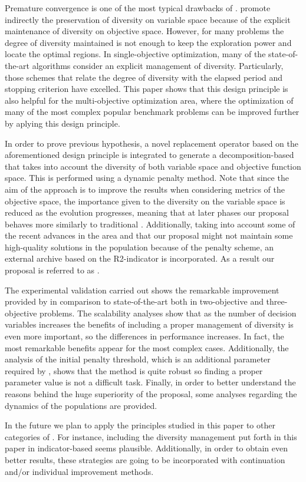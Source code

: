 Premature convergence is one of the most typical drawbacks of \EAS{}.
%
\MOEAS{} promote indirectly the preservation of diversity on variable space
because of the explicit maintenance of diversity on objective space.
%
However, for many problems the degree of diversity maintained is not enough to keep the exploration
power and locate the optimal regions.
%
In single-objective optimization, many of the state-of-the-art algorithms consider an explicit management of
diversity.
%
Particularly, those schemes that relate the degree of diversity with the elapsed period and stopping criterion
have excelled.
%
This paper shows that this design principle is also helpful for the multi-objective optimization area,
where the optimization of many of the most complex popular benchmark problems can be improved further
by aplying this design principle.

In order to prove previous hypothesis, a novel replacement operator based on the aforementioned design principle
is integrated to generate a decomposition-based \MOEA{} that takes into account the diversity of both variable 
space and objective function space.
%
This is performed using a dynamic penalty method. 
%
Note that since the aim of the approach is to improve the results when considering metrics of the objective space,
the importance given to the diversity on the variable space is reduced as the evolution progresses, meaning that
at later phases our proposal behaves more similarly to traditional \MOEAS{}.
%
Additionally, taking into account some of the recent advances in the area and that our proposal might not maintain
some high-quality solutions in the population because of the penalty scheme, an external archive based on the
R2-indicator is incorporated.
%
As a result our proposal is referred to as \AVSDMOEAD{}.
%

The experimental validation carried out shows the remarkable improvement provided by \AVSDMOEAD{} in comparison to
state-of-the-art \MOEAS{} both in two-objective and three-objective problems.
%
The scalability analyses show that as the number of decision variables increases the benefits of including
a proper management of diversity is even more important, so the differences in performance increases.
%
In fact, the most remarkable benefits appear for the most complex cases.
%
Additionally, the analysis of the initial penalty threshold, which is an additional parameter required by \AVSDMOEAD{}, 
shows that the method is quite robust so finding a proper parameter value is not a difficult task.
%
Finally, in order to better understand the reasons behind the huge superiority of the proposal, some analyses regarding
the dynamics of the populations are provided.

In the future we plan to apply the principles studied in this paper to other categories of \MOEAS{}.
%
For instance, including the diversity management put forth in this paper in indicator-based \MOEAS{} seems plausible.
%
Additionally, in order to obtain even better results, these strategies are going to be incorporated with continuation and/or individual
improvement methods.
